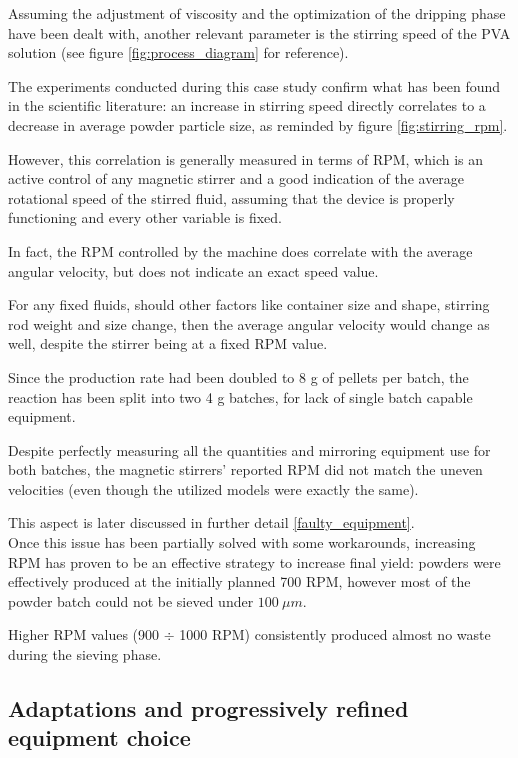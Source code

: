 \documentclass{article}
\begin{document}
        Assuming the adjustment of viscosity and the optimization of the dripping phase have been dealt with, 
        another relevant parameter is the stirring speed of the PVA solution (see figure \ref{fig:process_diagram} for reference). 

        The experiments conducted during this case study confirm what has been found in the scientific literature: 
        an increase in stirring speed directly correlates to a decrease in average powder particle size, as reminded by figure \ref{fig:stirring_rpm}. 

        However, this correlation is generally measured in terms of RPM, which is an active control of any magnetic stirrer and 
        a good indication of the average rotational speed of the stirred fluid, assuming that the device is properly functioning
        and every other variable is fixed. 
        
        In fact, the RPM controlled by the machine does correlate with the average angular velocity, but does not indicate 
        an exact speed value. 

        For any fixed fluids, should other factors like container size and shape, stirring rod weight and size change, 
        then the average angular velocity would change as well, despite the stirrer being at a fixed RPM value. 

        Since the production rate had been doubled to 8 g of pellets per batch, the reaction has been split into two 
        4 g batches, for lack of single batch capable equipment. 

        Despite perfectly measuring all the quantities and mirroring equipment use for both batches, the magnetic stirrers'
        reported RPM did not match the uneven velocities (even though the utilized models were exactly the same). 

        This aspect is later discussed in further detail \ref{faulty_equipment}. \\ 

        Once this issue has been partially solved with some workarounds, increasing RPM has proven to be an effective 
        strategy to increase final yield: powders were effectively produced at the initially planned 700 RPM, however 
        most of the powder batch could not be sieved under $100 \ \mu m$. 

        Higher RPM values (900 $\div $ 1000 RPM) consistently produced almost no waste during the sieving phase. 


        \subsection{Adaptations and progressively refined equipment choice\label{faulty_equipment}}
\end{document}
